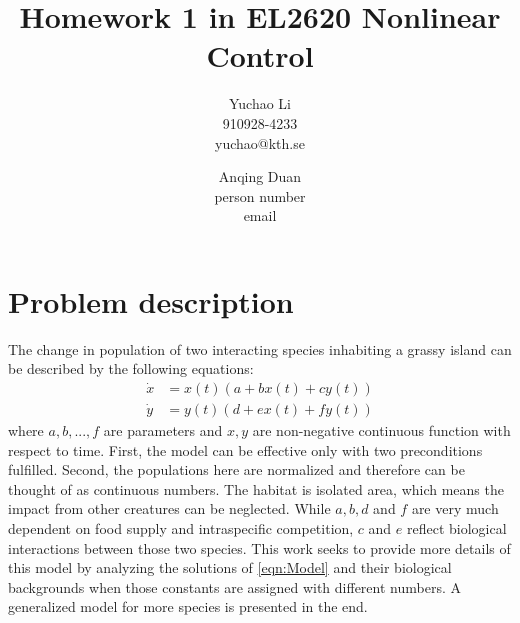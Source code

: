 \documentclass[a4paper,twocolumn]{article} %
\begin{document}

\title{Homework 1 in EL2620 Nonlinear Control}
\author{Yuchao Li \\ 910928-4233 \\ yuchao@kth.se \and Anqing Duan\\
  person number \\ email}

\maketitle                     %





\section*{Problem description}
\label{sec:prob}

The change in population of two interacting species inhabiting a grassy island can be described by the following equations:
\begin{equation}\label{eqn:Model}
\begin{aligned} 
\dot{x}&=x(t)(a+bx(t)+cy(t)) \\
\dot{y}&=y(t)(d+ex(t)+fy(t))
\end{aligned}
\end{equation}
where $a, b, ... ,f$ are parameters and $x, y$ are non-negative continuous function with respect to time. First, the model can be effective only with two preconditions fulfilled. Second, the populations here are normalized and therefore can be thought of as continuous numbers. The habitat is isolated area, which means the impact from other creatures can be neglected. While $a, b, d$ and $f$ are very much dependent on food supply and intraspecific competition, $c$ and $e$ reflect biological interactions between those two species. This work seeks to provide more details of this model by analyzing the solutions of \eqref{eqn:Model} and their biological backgrounds when those constants are assigned with different numbers. A generalized model for more species is presented in the end.

\end{document}
